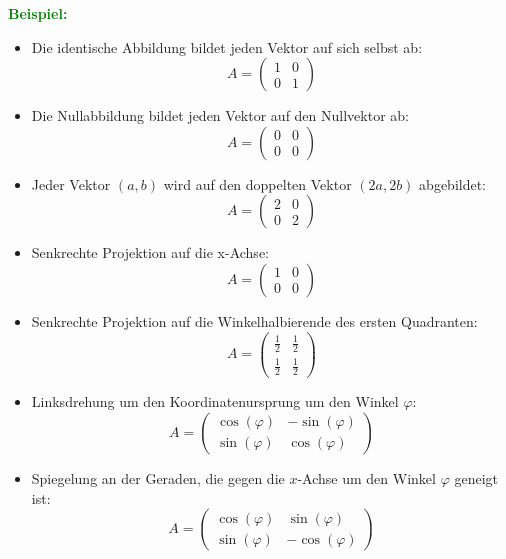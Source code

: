 \documentclass{article}
\newcommand{\green}[1]{\textcolor{green}{#1}}
\newcommand{\ex}{\green{\textbf{Beispiel: }}}
\begin{document}
\ex \begin{itemize}
    \item Die identische Abbildung bildet jeden Vektor auf sich selbst ab:
    $$
    A = \begin{pmatrix}
        1 & 0\\
        0 & 1
    \end{pmatrix}
    $$
    \item Die Nullabbildung bildet jeden Vektor auf den Nullvektor ab:
    $$
    A = \begin{pmatrix}
        0 & 0\\
        0 & 0
    \end{pmatrix}
    $$
    \item Jeder Vektor $(a,b)$ wird auf den doppelten Vektor $(2a,2b)$ abgebildet:
    $$
    A = \begin{pmatrix}
        2 & 0\\
        0 & 2
    \end{pmatrix}
    $$
    \item Senkrechte Projektion auf die x-Achse:
    $$
    A = \begin{pmatrix}
        1 & 0\\
        0 & 0
    \end{pmatrix}
    $$
    \item Senkrechte Projektion auf die Winkelhalbierende des ersten Quadranten:
    $$
    A = \begin{pmatrix}
        \frac{1}{2} & \frac{1}{2}\\
        \frac{1}{2} & \frac{1}{2}
    \end{pmatrix}
    $$
    \item Linksdrehung um den Koordinatenursprung um den Winkel $\varphi$:
    $$
    A = \begin{pmatrix}
        \cos(\varphi) & -\sin(\varphi)\\
        \sin(\varphi) & \cos(\varphi)
    \end{pmatrix}
    $$
    \item Spiegelung an der Geraden, die gegen die $x$-Achse um den Winkel $\varphi$ geneigt ist:
    $$
    A = \begin{pmatrix}
        \cos(\varphi) & \sin(\varphi)\\
        \sin(\varphi) & -\cos(\varphi)
    \end{pmatrix}
    $$
\end{itemize}
\end{document}
